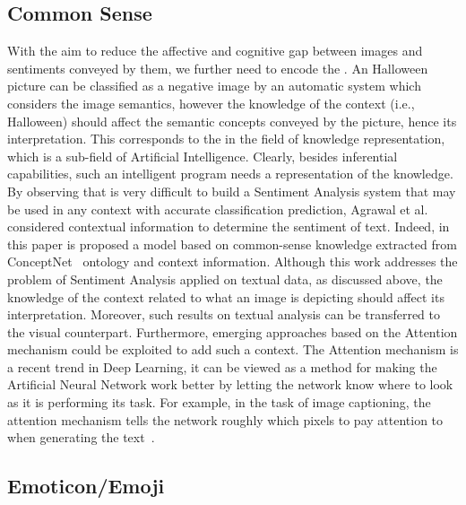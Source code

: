 \subsection{Common Sense}
With the aim to reduce the affective and cognitive gap between images and sentiments conveyed by them, we further need to encode the . 
An Halloween picture %
can be classified as a negative image by an automatic system which considers the image semantics, however the knowledge of the context (i.e., Halloween) should affect the semantic concepts conveyed by the picture, hence its interpretation. 
This corresponds to the  in the field of knowledge representation, which is a sub-field of Artificial Intelligence.
Clearly, besides inferential capabilities, such an intelligent program needs a representation of the knowledge. %
By observing that is very difficult to build a Sentiment Analysis system that may be used in any context with accurate classification prediction, Agrawal et al.~\cite{agarwal2015sentiment} considered contextual information to determine the sentiment of text. Indeed, in this paper is proposed a model based on common-sense knowledge extracted from ConceptNet~\cite{liu2004conceptnet} ontology and context information. Although this work addresses the problem of Sentiment Analysis applied on textual data, as discussed above, the knowledge of the context related to what an image is depicting should affect its interpretation. Moreover, such results on textual analysis can be transferred to the visual counterpart. Furthermore, emerging approaches based on the Attention mechanism could be exploited to add such a context. The Attention mechanism is a recent trend in Deep Learning, it can be viewed as a method for making the Artificial Neural Network work better by letting the network know where to look as it is performing its task. For example, in the task of image captioning, the attention mechanism tells the network roughly which pixels to pay attention to when generating the text~\cite{xu2015show,you2016image}.

\subsection{Emoticon/Emoji}\label{secEmoji}

